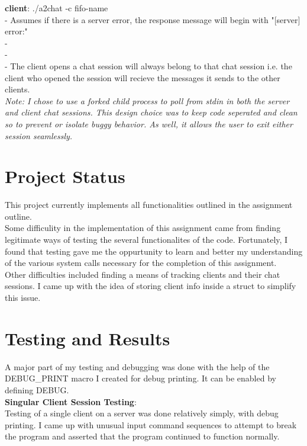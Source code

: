 \documentclass{article}
\begin{document}
\noindent
\textbf{client}: ./a2chat -c fifo-name \\
- Assumes if there is a server error, the response
message will begin with "[server] error:"\\
- \\
- \\
- The client opens a chat session will always
belong to that chat session i.e. the client
who opened the session will recieve the messages
it sends to the other clients. \\

\noindent
\textit{Note: I chose to use a forked child process to poll
from stdin in both the server and client chat sessions. This
design choice was to keep code seperated and clean so to
prevent or isolate buggy behavior. As well, it allows the
user to exit either session seamlessly.}

\section{Project Status}
This project currently implements all functionalities outlined in the
assignment outline. \\

\noindent
Some difficulity in the implementation of this
assignment came from finding legitimate ways of testing the several
functionalites of the code. Fortunately, I found that testing gave me the
oppurtunity to learn and better my understanding of the various system calls
necessary for the completion of this assignment. \\

\noindent
Other difficulties included finding a means of tracking clients
and their chat sessions. I came up with the idea of storing client
info inside a struct to simplify this issue.


\section{Testing and Results}

A major part of my testing and debugging was done with
the help of the DEBUG\_PRINT macro I created for
debug printing. It can be enabled by defining DEBUG. \\

\noindent
\textbf{Singular Client Session Testing}: \\
Testing of a single client on a server was done
relatively simply, with debug printing. I came up
with unusual input command sequences to attempt to
break the program and asserted that the program
continued to function normally. \\
\end{document}
